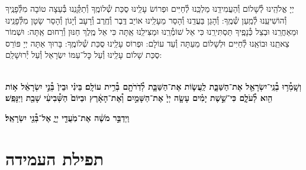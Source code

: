 \documentclass[twoside, openany, parskip=half, 11pt]{book}
\begin{document}
\vehaya

\vayomer{}

\emesveemuna

יְיָ אֱלֹהֵֽינוּ לְ֯שָׁלוֹם וְ֯הַעֲמִידֵֽנוּ מַלְכֵּֽנוּ לְ֯חַיִּים וּפְרוֹשׂ עָלֵֽינוּ סֻכַּת שְׁ֯לוֹמֶֽךָ וְ֯תַקְּ֯נֵֽנוּ בְּ֯עֵצָה טוֹבָה מִלְּ֯פָנֶֽיךָ וְ֯הוֹשִׁיעֵֽנוּ לְ֯מַֽעַן שְׁ֯מֶֽךָ: וְ֯הָגֵן בַּעֲדֵֽנוּ וְ֯הָסֵר מֵעָלֵֽינוּ אוֹיֵב דֶּֽבֶר וְ֯חֶֽרֶב וְ֯רָעָב וְ֯יָגוֹן וְ֯הָסֵר שָׂטָן מִלְּ֯פָנֵֽינוּ וּמֵאַחֲרֵֽנוּ וּבְצֵל כְּ֯נָפֶֽיךָ תַּסְתִּירֵֽנוּ כִּי אֵל שׁוֹמְ֯רֵֽנוּ וּמַצִּילֵֽנוּ אַֽתָּה כִּי אֵל מֶֽלֶךְ חַנּוּן וְ֯רַחוּם אַֽתָּה: וּשְׁמוֹר צֵאתֵֽנוּ וּבוֹאֵֽנוּ לְ֯חַיִּים וּלְשָׁלוֹם מֵעַתָּה וְ֯עַד עוֹלָם: וּפְרוֹס עָלֵֽינוּ סֻכַּת שְׁ֯לוֹמֶֽךָ: בָּרוּךְ אַתָּה יְיָ פּוֹרֵס סֻכַּת שָׁלוֹם עָלֵֽינוּ וְ֯עַל כׇּל־עַמּוֹ יִשְׂרָאֵל וְ֯עַל יְ֯רוּשָׁלַ‍ִם:

\\
\textbf{וְשָֽׁמְ֯ר֥וּ בְ֯נֵֽי־יִשְׂרָאֵ֖ל אֶת־הַשַּׁבָּ֑ת
לַֽעֲשׂ֧וֹת אֶת־הַשַּׁבָּ֛ת לְ֯דֹֽרֹתָ֖ם בְּ֯רִ֥ית עוֹלָֽם׃ בֵּינִ֗י וּבֵין֙ בְּ֯נֵ֣י יִשְׂרָאֵ֔ל א֥וֹת הִ֖וא לְ֯עֹלָ֑ם כִּי־שֵׁ֣שֶׁת יָמִ֗ים עָשָׂ֤ה יְיָ֙
אֶת־הַשָּׁמַ֣יִם וְ֯אֶת־הָאָ֔רֶץ וּבַיּוֹם֙ הַשְּׁ֯בִיעִ֔י שָׁבַ֖ת וַיִּנָּפַֽשׁ׃
}

\textbf{
וַיְדַבֵּ֣ר מֹשֶׁ֔ה אֶת־מֹֽעֲדֵ֖י יְיָ֑ אֶל־בְּ֯נֵ֖י יִשְׂרָאֵֽל׃
}



\halfkaddish

\section[תפילת העמידה]{ תפילת העמידה }

\newcommand{\shabbosshuva}{בשבת שובה:}


\newcommand{\shabboskiddushhashem}{
\firstword{אַתָּה קָדוֹשׁ}
וְ֯שִׁמְךָ קָדוֹשׁ וּקְדוֹשִׁים בְּ֯כׇל־יוֹם יְ֯הַלְ֯לוּךָ סֶּֽלָה: בָּרוּךְ אַתָּה יְיָ *הָאֵל
(*\instruction{בשבת שובה:}
הַמֶּֽלֶךְ)
הַקָּדוֹשׁ:
}


\newcommand{\shabboskiddushhayom}[1]{{
\firstword{אֱלֹהֵינוּ}
וֵאלֹהֵי אֲבוֹתֵינוּ רְ֯צֵה בִמְנוּחָתֵנוּ קַדְּ֯שֵׁנוּ בְּ֯מִצְוֹתֶיךָ וְ֯תֵן חֶלְקֵנוּ בְּ֯תוֹרָתֶךָ שַׂבְּ֯עֵנוּ מִטּוּבֶךָ וְ֯שַׂמְּ֯חֵנוּ בִּישׁוּעָתֶךָ וְ֯טַהֵר לִבֵּנוּ לְ֯עׇבְדְּ֯ךָ בֶּאֱמֶת: וְ֯הַנְחִילֵנוּ יְיָ אֱלֹהֵינוּ בְּ֯אַהֲבָה וּבְרָצוֹן שַׁבַּת קׇדְשֶׁךָ וְ֯יָנוּחוּ בָהּ#1 יִשְׂרָאֵל מְ֯קַדְּ֯שֵׁי שְׁ֯מֶךָ:
בָּרוּךְ אַתָּה יְיָ מְ֯קַדֵּשׁ הַשַּׁבָּת:
}}
\end{document}
